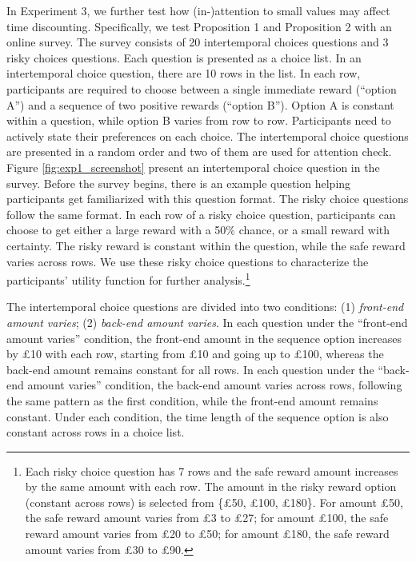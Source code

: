 \documentclass[
  12pt,
]{article}
\begin{document}
In Experiment 3, we further test how (in-)attention to small values may
affect time discounting. Specifically, we test Proposition 1 and
Proposition 2 with an online survey. The survey consists of 20
intertemporal choices questions and 3 risky choices questions. Each
question is presented as a choice list. In an intertemporal choice
question, there are 10 rows in the list. In each row, participants are
required to choose between a single immediate reward (``option A'') and
a sequence of two positive rewards (``option B''). Option A is constant
within a question, while option B varies from row to row. Participants
need to actively state their preferences on each choice. The
intertemporal choice questions are presented in a random order and two
of them are used for attention check. Figure \ref{fig:exp1_screenshot}
present an intertemporal choice question in the survey. Before the
survey begins, there is an example question helping participants get
familiarized with this question format. The risky choice questions
follow the same format. In each row of a risky choice question,
participants can choose to get either a large reward with a 50\% chance,
or a small reward with certainty. The risky reward is constant within
the question, while the safe reward varies across rows. We use these
risky choice questions to characterize the participants' utility
function for further analysis.\footnote{Each risky choice question has 7
  rows and the safe reward amount increases by the same amount with each
  row. The amount in the risky reward option (constant across rows) is
  selected from \{£50, £100, £180\}. For amount £50, the safe reward
  amount varies from £3 to £27; for amount £100, the safe reward amount
  varies from £20 to £50; for amount £180, the safe reward amount varies
  from £30 to £90.}

The intertemporal choice questions are divided into two conditions: (1)
\emph{front-end amount varies}; (2) \emph{back-end amount varies}. In
each question under the ``front-end amount varies'' condition, the
front-end amount in the sequence option increases by £10 with each row,
starting from £10 and going up to £100, whereas the back-end amount
remains constant for all rows. In each question under the ``back-end
amount varies'' condition, the back-end amount varies across rows,
following the same pattern as the first condition, while the front-end
amount remains constant. Under each condition, the time length of the
sequence option is also constant across rows in a choice list.
\end{document}
